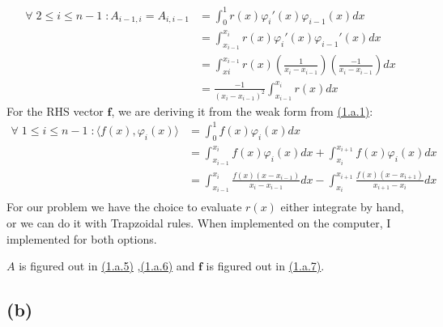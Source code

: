 \documentclass[]{article}
\begin{document}
        \begin{align*}\tag{1.a.6}\label{eqn:1.a.6}
            \forall\; 2 \le i \le n - 1 \; :
            A_{i - 1, i} = A_{i, i - 1} 
            &= 
            \int_{0}^{1} 
                r(x)\varphi_i'(x)\varphi_{i- 1}(x)
            dx
            \\
            &= 
                \int_{x_{i - 1 }}^{x_i} 
                    r(x)\varphi_i'(x)\varphi_{i - 1}'(x)
                dx
            \\
            &= 
            \int_{x{i}}^{x_{i - 1}} 
                r(x)
                \left(
                    \frac{1}{x_i - x_{i - 1}}
                \right)
                \left(
                    \frac{-1}{x_i - x_{i - 1}}
                \right)
            dx
            \\
            &= 
            \frac{-1}{(x_i - x_{i - 1})^2}
            \int_{x_{i - 1}}^{x_i} 
                r(x)
            dx
        \end{align*}
        For the RHS vector $\mathbf{f}$, we are deriving it from the weak form from \hyperref[eqn:1.a.1]{(1.a.1)}: 
        \begin{align*}\tag{1.a.7}\label{eqn:1.a.7}
            \forall\; 1 \le i \le n - 1\;: 
            \langle f(x), \varphi_i(x)\rangle
            &= 
            \int_{0}^{1} 
                f(x)\varphi_i(x)
            dx
            \\
            &= \int_{x_{i - 1}}^{x_i} 
                f(x)\varphi_i(x)
            dx + 
            \int_{x_i}^{x_{i + 1}} 
                f(x)\varphi_i(x)
            dx
            \\
            &= 
            \int_{x_{i - 1}}^{x_i} 
                \frac{f(x)(x - x_{i - 1})}{x_i - x_{i - 1}}
            dx - 
            \int_{x_i}^{x_{i + 1}}
                \frac{f(x)(x - x_{i + 1})}{x_{i + 1} - x_i}
            dx
            \\
        \end{align*}
        For our problem we have the choice to evaluate $r(x)$ either integrate by hand, or we can do it with Trapzoidal rules. When implemented on the computer, I implemented for both options. 
        \par
        $A$ is figured out in \hyperref[eqn:1.a.5]{(1.a.5)} ,\hyperref[eqn:1.a.5]{(1.a.6)} and $\mathbf{f}$ is figured out in \hyperref[eqn:1.a.7]{(1.a.7)}. 
    \subsection*{(b)}
\end{document}
